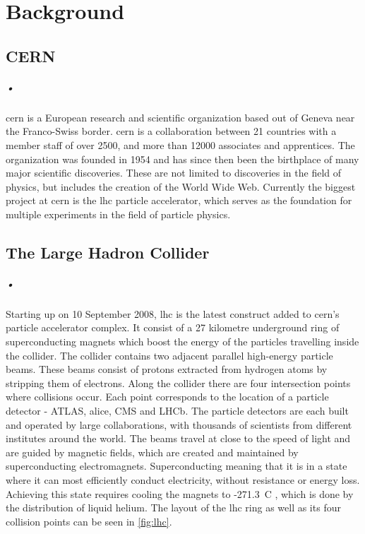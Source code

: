 \documentclass[a4paper, 12pt, openright, twoside]{report}
\begin{document}
\chapter{Background}

\section{CERN}
\paragraph{•}
\gls{cern} is a European research and scientific organization based out of Geneva near the Franco-Swiss border\cite{cern}.
\gls{cern} is a collaboration between 21 countries with a member staff of over 2500, and more than 12000 associates and apprentices.
The organization was founded in 1954 and has since then been the birthplace of many major scientific discoveries.
These are not limited to discoveries in the field of physics, but includes the creation of the World Wide Web\cite{www}.
Currently the biggest project at \gls{cern} is the \gls{lhc} particle accelerator, which serves as the foundation for multiple experiments in the field of particle physics.

\section{The Large Hadron Collider}
\label{sec:lhc}
\paragraph{•}
Starting up on 10 September 2008, \gls{lhc} is the latest construct added to \gls{cern}'s particle accelerator complex\cite{lhc}.
It consist of a 27 kilometre underground ring of superconducting magnets which boost the energy of the particles travelling inside the collider.
The collider contains two adjacent parallel high-energy particle beams.
These beams consist of protons extracted from hydrogen atoms by stripping them of electrons.
Along the collider there are four intersection points where collisions occur.
Each point corresponds to the location of a particle detector - ATLAS, \gls{alice}, CMS and LHCb.
The particle detectors are each built and operated by large collaborations, with thousands of scientists from different institutes around the world.
The beams travel at close to the speed of light and are guided by magnetic fields, which are created and maintained by superconducting electromagnets.
Superconducting meaning that it is in a state where it can most efficiently conduct electricity, without resistance or energy loss.
Achieving this state requires cooling the magnets to -271.3\degree~C , which is done by the distribution of liquid helium.
The layout of the \gls{lhc} ring as well as its four collision points can be seen in \ref{fig:lhc}.
\end{document}
